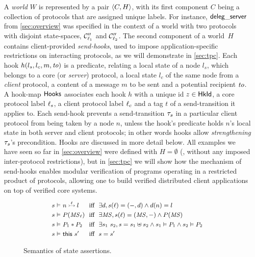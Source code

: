 A \emph{world} $W$ is represented by a pair $\langle{C, H}\rangle$, with its
first component $C$ being a collection of protocols that are assigned
unique labels. For instance, $\mathsf{deleg\_server}$ from
\cref{sec:overview} was specified in the context of a world
with two protocols with disjoint state-spaces, $\mathcal{C}''_{\ell_1}$ and
$\mathcal{C}''_{\ell_2}$.
%
The second component of a world~$H$ contains client-provided
\emph{send-hooks}, used to impose application-specific restrictions on
interacting protocols, as we will demonstrate in
\cref{sec:tpc}.
%
Each hook $h(l_s, l_c, m, \mathit{to})$ is a predicate,
relating a local state of a node $l_s$, which belongs to a core (or
\emph{server}) protocol, a local state $l_c$ of the same node from a
\emph{client} protocol, a content of a message $m$ to be sent and a
potential recipient $\mathit{to}$. A hook-map $\mathsf{Hooks}$ associates each hook
$h$ with a unique id $z \in \mathsf{HkId}$, a core protocol label $\ell_s$, a
client protocol label $\ell_c$ and a tag $t$ of a send-transition it
applies to. Each send-hook prevents a send-transition $\tau_s$ in a
particular client protocol from being taken by a node $n$, unless the
hook's predicate holds \wrt $n$'s local state in both server and
client protocols; in other words hooks allow \emph{strengthening}
$\tau_s$'s precondition.  Hooks are discussed in more detail below.
%
All examples we have seen so far in \cref{sec:overview} were
defined with $H = \emptyset$ (\ie, without any imposed inter-protocol
restrictions), but in \cref{sec:tpc} we will show how the
mechanism of send-hooks enables modular verification of programs
operating in a restricted product of protocols, allowing one to build
verified distributed client applications on top of verified core
systems.

{
\setlength{\belowcaptionskip}{-10pt}
\begin{figure}
\centering
{\begin{varwidth}{\dimexpr{}\fboxrule\relax}
\[
{\small{
\begin{array}{r@{\ }c@{\ }l@{\ \ }c@{\ \ }l}
  s & \vDash & n \ppts{\lab} l & \text{iff} &
                                                     \exists d, s(\lab) = (-, d) \aand  d(n) = l \\[3pt]
  s & \vDash & P(\MS_{\lab}) & \text{iff} & \exists \MS, s(\lab) = (\MS, -) \aand
                                                   P(\MS) \\[3pt]
  s & \vDash & P_1 \psep P_2 & \text{iff} &
                                            \exists s_1~s_2,  s = s_1 \join s_2 \aand  s_1 \vDash P_1 \aand
                                            s_2 \vDash P_2
  \\[3pt]
  s & \vDash & \This{s'} & \text{iff} & s = s'
\end{array}
}}
\]
\end{varwidth}}
\caption{Semantics of \disel state assertions.}
\label{fig:dsem}
\end{figure}
}

